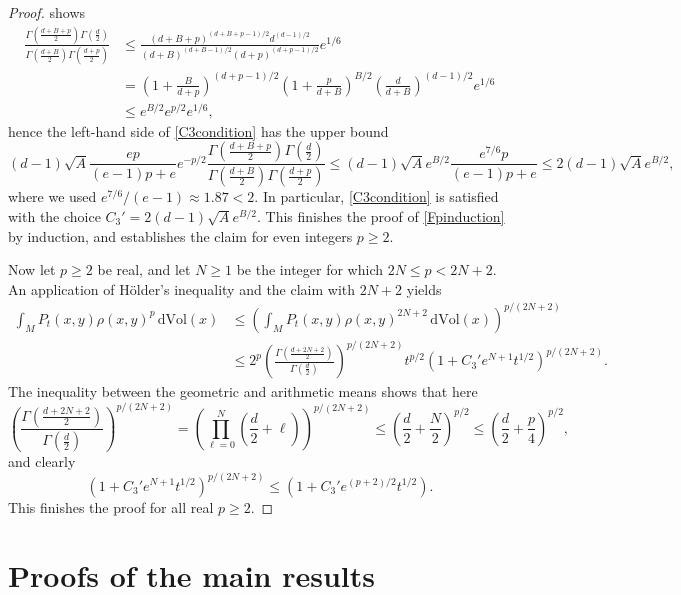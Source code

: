 \documentclass[11pt,a4paper]{article}
\theoremstyle{definition}
\begin{document}
\begin{proof}
shows
\[ \begin{split} \frac{\Gamma \left( \frac{d+B+p}{2} \right) \Gamma \left( \frac{d}{2} \right)}{\Gamma \left( \frac{d+B}{2} \right) \Gamma \left( \frac{d+p}{2} \right)} &\le \frac{(d+B+p)^{(d+B+p-1)/2} d^{(d-1)/2}}{(d+B)^{(d+B-1)/2} (d+p)^{(d+p-1)/2}} e^{1/6} \\ &= \left( 1+\frac{B}{d+p} \right)^{(d+p-1)/2} \left( 1+\frac{p}{d+B} \right)^{B/2} \left( \frac{d}{d+B} \right)^{(d-1)/2} e^{1/6} \\ &\le e^{B/2} e^{p/2} e^{1/6}, \end{split} \]
hence the left-hand side of \eqref{C3condition} has the upper bound
\[ (d-1) \sqrt{A} \frac{ep}{(e-1)p+e} e^{-p/2} \frac{\Gamma \left( \frac{d+B+p}{2} \right) \Gamma \left( \frac{d}{2} \right)}{\Gamma \left( \frac{d+B}{2} \right) \Gamma \left( \frac{d+p}{2} \right)} \le (d-1) \sqrt{A} e^{B/2} \frac{e^{7/6}p}{(e-1)p+e} \le 2 (d-1) \sqrt{A} e^{B/2} , \]
where we used $e^{7/6}/(e-1) \approx 1.87 <2$. In particular, \eqref{C3condition} is satisfied with the choice $C_3' = 2 (d-1) \sqrt{A} e^{B/2}$. This finishes the proof of \eqref{Fpinduction} by induction, and establishes the claim for even integers $p \ge 2$.

Now let $p \ge 2$ be real, and let $N \ge 1$ be the integer for which $2N \le p < 2N+2$. An application of H\"older's inequality and the claim with $2N+2$ yields
\[ \begin{split} \int_M P_t(x,y) \rho(x,y)^p \, \mathrm{d} \mathrm{Vol}(x) &\le \left( \int_M P_t(x,y) \rho(x,y)^{2N+2} \, \mathrm{d} \mathrm{Vol}(x) \right)^{p/(2N+2)} \\ &\le 2^p \left( \frac{\Gamma \left( \frac{d+2N+2}{2} \right)}{\Gamma \left( \frac{d}{2} \right)} \right)^{p/(2N+2)} t^{p/2} \left( 1+C_3' e^{N+1} t^{1/2} \right)^{p/(2N+2)} . \end{split} \]
The inequality between the geometric and arithmetic means shows that here
\[ \left( \frac{\Gamma \left( \frac{d+2N+2}{2} \right)}{\Gamma \left( \frac{d}{2} \right)} \right)^{p/(2N+2)} = \left( \prod_{\ell=0}^N \left( \frac{d}{2} +\ell \right) \right)^{p/(2N+2)} \le \left( \frac{d}{2} + \frac{N}{2} \right)^{p/2} \le \left( \frac{d}{2} + \frac{p}{4} \right)^{p/2} , \]
and clearly
\[ \left( 1+C_3' e^{N+1} t^{1/2} \right)^{p/(2N+2)} \le \left( 1+C_3' e^{(p+2)/2} t^{1/2} \right) . \]
This finishes the proof for all real $p \ge 2$.
\end{proof}

\section{Proofs of the main results}\label{proofsection}
\end{document}
